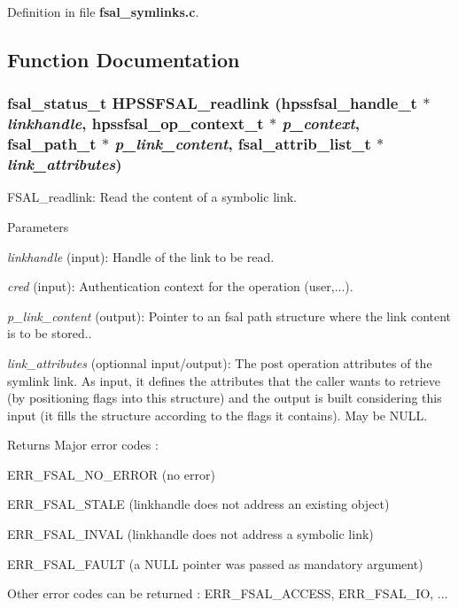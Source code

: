 Definition in file {\bf fsal\_\-symlinks.c}.

\subsection{Function Documentation}
\subsubsection[{HPSSFSAL\_\-readlink}]{\setlength{\rightskip}{0pt plus 5cm}fsal\_\-status\_\-t HPSSFSAL\_\-readlink (hpssfsal\_\-handle\_\-t $\ast$ {\em linkhandle}, \/  hpssfsal\_\-op\_\-context\_\-t $\ast$ {\em p\_\-context}, \/  fsal\_\-path\_\-t $\ast$ {\em p\_\-link\_\-content}, \/  fsal\_\-attrib\_\-list\_\-t $\ast$ {\em link\_\-attributes})}\label{fsal__symlinks_8c_aade6f8332c5b9fea82a281df362c7c8b}
FSAL\_\-readlink: Read the content of a symbolic link.


\begin{DoxyParams}{Parameters}
\item[{\em linkhandle}](input): Handle of the link to be read. \item[{\em cred}](input): Authentication context for the operation (user,...). \item[{\em p\_\-link\_\-content}](output): Pointer to an fsal path structure where the link content is to be stored.. \item[{\em link\_\-attributes}](optionnal input/output): The post operation attributes of the symlink link. As input, it defines the attributes that the caller wants to retrieve (by positioning flags into this structure) and the output is built considering this input (it fills the structure according to the flags it contains). May be NULL.\end{DoxyParams}
\begin{DoxyReturn}{Returns}
Major error codes :
\begin{DoxyItemize}
\item ERR\_\-FSAL\_\-NO\_\-ERROR (no error)
\item ERR\_\-FSAL\_\-STALE (linkhandle does not address an existing object)
\item ERR\_\-FSAL\_\-INVAL (linkhandle does not address a symbolic link)
\item ERR\_\-FSAL\_\-FAULT (a NULL pointer was passed as mandatory argument)
\item Other error codes can be returned : ERR\_\-FSAL\_\-ACCESS, ERR\_\-FSAL\_\-IO, ... 
\end{DoxyItemize}
\end{DoxyReturn}


